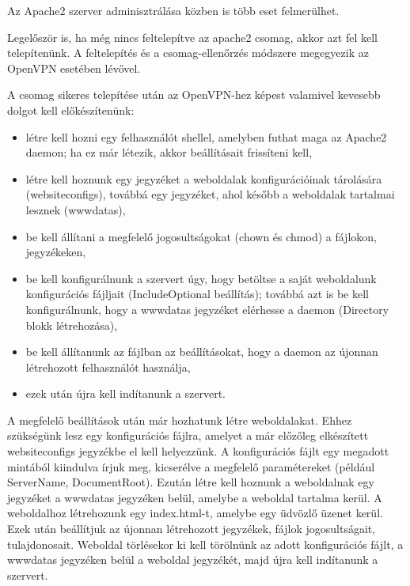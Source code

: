 
Az Apache2 szerver adminisztrálása közben is több eset felmerülhet.

Legelőször is, ha még nincs feltelepítve az apache2 csomag, akkor azt fel kell telepítenünk. A feltelepítés és a csomag-ellenőrzés módszere megegyezik az OpenVPN esetében lévővel.

A csomag sikeres telepítése után az OpenVPN-hez képest valamivel kevesebb dolgot kell előkészítenünk:
\begin{itemize}
	\item létre kell hozni egy felhasználót \textit{} shellel, amelyben futhat maga az Apache2 daemon; ha ez már létezik, akkor beállításait frissíteni kell,
	\item létre kell hoznunk egy jegyzéket a weboldalak konfigurációinak tárolására (websiteconfigs), továbbá egy jegyzéket, ahol később a weboldalak tartalmai lesznek (wwwdatas),
	\item be kell állítani a megfelelő jogosultságokat (chown és chmod) a fájlokon, jegyzékeken,
	\item be kell konfigurálnunk a szervert úgy, hogy betöltse a saját weboldalunk konfigurációs fájljait (IncludeOptional beállítás); továbbá azt is be kell konfigurálnunk, hogy a wwwdatas jegyzéket elérhesse a daemon (Directory blokk létrehozása),
	\item be kell állítanunk az \textit{} fájlban az  beállításokat, hogy a daemon az újonnan létrehozott felhasználót használja,
	\item ezek után újra kell indítanunk a szervert.
\end{itemize}
	
A megfelelő beállítások után már hozhatunk létre weboldalakat. Ehhez szükségünk lesz egy konfigurációs fájlra, amelyet a már előzőleg elkészített websiteconfigs jegyzékbe el kell helyezzünk. A konfigurációs fájlt egy megadott mintából kiindulva írjuk meg, kicserélve a megfelelő paramétereket (például ServerName, DocumentRoot). Ezután létre kell hoznunk a weboldalnak egy jegyzéket a wwwdatas jegyzéken belül, amelybe a weboldal tartalma kerül. A weboldalhoz létrehozunk egy index.html-t, amelybe egy üdvözlő üzenet kerül. Ezek után beállítjuk az újonnan létrehozott jegyzékek, fájlok jogosultságait, tulajdonosait. Weboldal törlésekor ki kell törölnünk az adott konfigurációs fájlt, a wwwdatas jegyzéken belül a weboldal jegyzékét, majd újra kell indítanunk a szervert.

